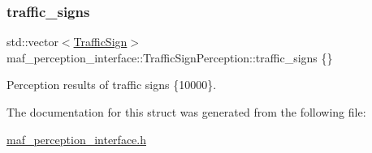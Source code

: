 \subsubsection{\texorpdfstring{traffic\+\_\+signs}{traffic\_signs}}
{\footnotesize\ttfamily std\+::vector$<$\hyperlink{structmaf__perception__interface_1_1TrafficSign}{Traffic\+Sign}$>$ maf\+\_\+perception\+\_\+interface\+::\+Traffic\+Sign\+Perception\+::traffic\+\_\+signs \{\}}



Perception results of traffic signs \{10000\}. 



The documentation for this struct was generated from the following file\+:\begin{DoxyCompactItemize}
\item 
\hyperlink{maf__perception__interface_8h}{maf\+\_\+perception\+\_\+interface.\+h}\end{DoxyCompactItemize}
